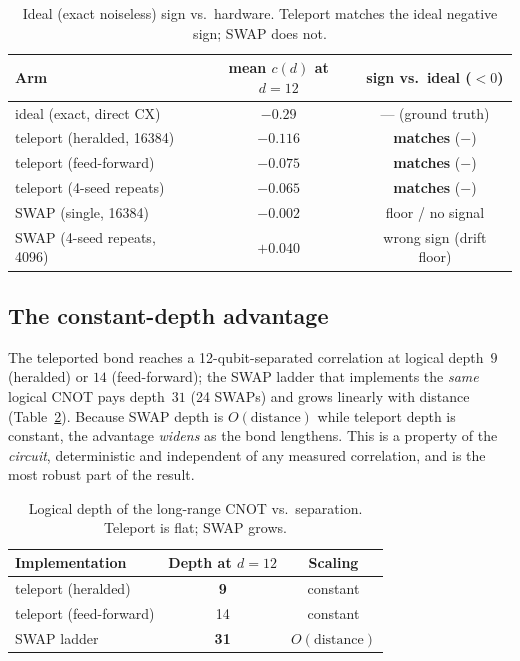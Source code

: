 \documentclass[conference]{IEEEtran}
\begin{document}
\begin{table}[H]
\caption{Ideal (exact noiseless) sign vs.\ hardware. Teleport matches the ideal negative
sign; SWAP does not.}
\label{tab:vs}
\centering
\small
\begin{tabular}{@{}lcc@{}}
\toprule
\textbf{Arm} & \textbf{mean $c(d)$ at $d{=}12$} & \textbf{sign vs.\ ideal ($<0$)}\\
\midrule
ideal (exact, direct CX)   & $-0.29$ & --- (ground truth)\\
teleport (heralded, 16384) & $-0.116$ & \textbf{matches} ($-$)\\
teleport (feed-forward)    & $-0.075$ & \textbf{matches} ($-$)\\
teleport (4-seed repeats)  & $-0.065$ & \textbf{matches} ($-$)\\
SWAP (single, 16384)       & $-0.002$ & floor / no signal\\
SWAP (4-seed repeats, 4096)& $+0.040$ & wrong sign (drift floor)\\
\bottomrule
\end{tabular}
\end{table}

\subsection{The constant-depth advantage}

The teleported bond reaches a 12-qubit-separated correlation at logical depth~$9$
(heralded) or $14$ (feed-forward); the SWAP ladder that implements the \emph{same} logical
CNOT pays depth~$31$ (24 SWAPs) and grows linearly with distance
(Table~\ref{tab:depth}). Because SWAP depth is $O(\text{distance})$ while teleport depth is
constant, the advantage \emph{widens} as the bond lengthens. This is a property of the
\emph{circuit}, deterministic and independent of any measured correlation, and is the most
robust part of the result.

\begin{table}[H]
\caption{Logical depth of the long-range CNOT vs.\ separation. Teleport is flat; SWAP
grows.}
\label{tab:depth}
\centering
\small
\begin{tabular}{@{}lcc@{}}
\toprule
\textbf{Implementation} & \textbf{Depth at $d{=}12$} & \textbf{Scaling}\\
\midrule
teleport (heralded)     & \textbf{9}  & constant\\
teleport (feed-forward) & 14 & constant\\
SWAP ladder             & \textbf{31} & $O(\text{distance})$\\
\bottomrule
\end{tabular}
\end{table}
\end{document}
